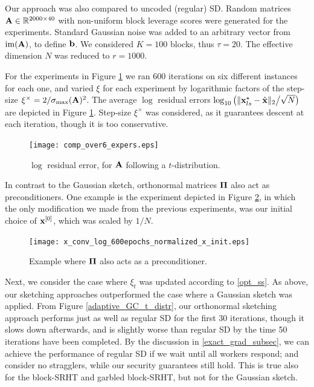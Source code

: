 \documentclass[journal,letterpaper,onecolumn,twoside,nofonttune]{IEEEtran}
\newcommand{\xb}{\bold{x}}
\newcommand{\xbh}{{\hat{\bold{x}}}}
\newcommand{\Pibold}{\bold{\Pi}}
\newcommand{\R}{\mathbb{R}}
\newcommand{\Ab}{\bold{A}}
\newcommand{\bb}{\bold{b}}
\newcommand{\image}{\mathrm{im}}
\begin{document}
Our approach was also compared to uncoded (regular) SD. Random matrices $\Ab\in\R^{2000\times40}$ with non-uniform block leverage scores were generated for the experiments. Standard Gaussian noise was added to an arbitrary vector from $\image(\Ab)$, to define $\bb$. We considered $K=100$ blocks, thus $\tau=20$. The effective dimension $N$ was reduced to $r=1000$.%

For the experiments in Figure \ref{log_res_err_t_distr} we ran 600 iterations on six different instances for each one, and varied $\xi$ for each experiment by logarithmic factors of the step-size $\xi^\times=2/\sigma_{\max}(\Ab)^2$. The average $\log$ residual errors $\log_{10}\big(\|\xb_{ls}^{\star}-\xbh\|_2\big/\sqrt{N}\big)$ are depicted in Figure \ref{log_res_err_t_distr}. Step-size $\xi^\times$ was considered, as it guarantees descent at each iteration, though it is too conservative.

\begin{figure}[h]
  \centering
    \texttt{[image: comp\_over6\_expers.eps]}
    \caption{$\log$ residual error, for $\Ab$ following a $t$-distribution.}
  \label{log_res_err_t_distr}
\end{figure}

In contrast to the Gaussian sketch, orthonormal matrices $\Pibold$ also act as preconditioners. One example is the experiment depicted in Figure \ref{precond_figure}, in which the only modification we made from the previous experiments, was our initial choice of $\xb^{[0]}$, which was scaled by $1/N$.

\begin{figure}[h]
  \centering
    \texttt{[image: x\_conv\_log\_600epochs\_normalized\_x\_init.eps]}
    \caption{Example where $\Pibold$ also acts as a preconditioner.}
  \label{precond_figure}
\end{figure}

Next, we consider the case where $\xi_t$ was updated according to \eqref{opt_ss}. As above, our sketching approaches outperformed the case where a Gaussian sketch was applied. From Figure \ref{adaptive_GC_t_distr}, our orthonormal sketching approach performs just as well as regular SD for the first 30 iterations, though it slows down afterwards, and is slightly worse than regular SD by the time 50 iterations have been completed. By the discussion in \ref{exact_grad_subsec}, we can achieve the performance of regular SD if we wait until all workers respond; and consider no stragglers, while our security guarantees still hold. This is true also for the block-SRHT and garbled block-SRHT, but not for the Gaussian sketch.
\end{document}
